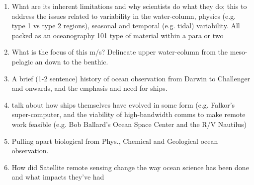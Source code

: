 \begin{enumerate} 



\item What are its inherent limitations and why scientists do what
  they do; this to address the issues related to variability in the
  water-column, physics (e.g. type 1 vs type 2 regions), seasonal and
  temporal (e.g. tidal) variability. All packed as an oceanography 101
  type of material within a para or two

\item What is the focus of this m/s? Delineate upper water-column from the
meso-pelagic an down to the benthic.

\item A brief (1-2 sentence) history of ocean observation from Darwin to
Challenger and onwards, and the emphasis and need for ships.

\item talk about how ships themselves have evolved in some form
  (e.g. Falkor’s super-computer, and the viability of high-bandwidth
  comms to make remote work feasible (e.g. Bob Ballard’s Ocean Space
  Center and the R/V Nautilus)



\item Pulling apart biological from Phys., Chemical and Geological ocean
observation. 

\item How did Satellite remote sensing change the way ocean science has
been done and what impacts they've had

\end{enumerate}
